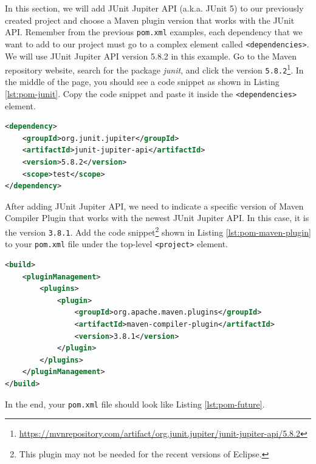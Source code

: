 In this section, we will add JUnit Jupiter API (a.k.a. JUnit 5) to our previously created project and choose a Maven plugin version that works with the JUnit API. Remember from the previous \verb|pom.xml| examples, each dependency that we want to add to our project must go to a complex element called \verb|<dependencies>|. We will use JUnit Jupiter API version 5.8.2 in this example. Go to the Maven repository website, search for the package \emph{junit}, and click the version \verb|5.8.2|\footnote{\url{https://mvnrepository.com/artifact/org.junit.jupiter/junit-jupiter-api/5.8.2}}. In the middle of the page, you should see a code snippet as shown in Listing \ref{lst:pom-junit}. Copy the code snippet and paste it inside the \verb|<dependencies>| element.

\begin{lstlisting}[language=XML,caption={JUnit Jupiter API version 5.8.2 dependency element.},label=lst:pom-junit]
<dependency>
    <groupId>org.junit.jupiter</groupId>
    <artifactId>junit-jupiter-api</artifactId>
    <version>5.8.2</version>
    <scope>test</scope>
</dependency>
\end{lstlisting}

After adding JUnit Jupiter API, we need to indicate a specific version of Maven Compiler Plugin that works with the newest JUnit Jupiter API. In this case, it is the version \verb|3.8.1|. Add the code snippet\footnote{This plugin may not be needed for the recent versions of Eclipse.} shown in Listing \ref{lst:pom-maven-plugin} to your \verb|pom.xml| file under the top-level \verb|<project>| element.

\begin{lstlisting}[language=XML,caption={A compatible Maven Compiler Plugin JUnit Jupiter API v5.8.2..},label=lst:pom-maven-plugin]
<build>
    <pluginManagement>
        <plugins>
            <plugin>
                <groupId>org.apache.maven.plugins</groupId>
                <artifactId>maven-compiler-plugin</artifactId>
                <version>3.8.1</version>
            </plugin>
        </plugins>
    </pluginManagement>
</build>
\end{lstlisting}

In the end, your \verb|pom.xml| file should look like Listing \ref{lst:pom-future}.

